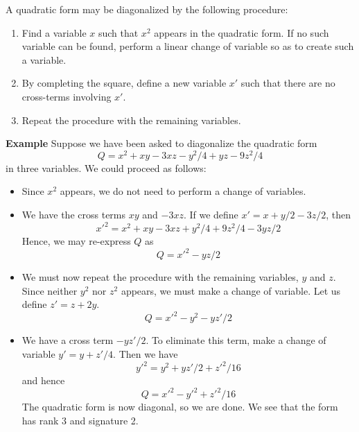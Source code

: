 \documentclass[12pt]{article}
\begin{document}
A quadratic form may be diagonalized by the following procedure:
\begin{enumerate}
\item  Find a variable $x$ such that $x^2$ appears in the quadratic form.  If no such variable can be found, perform a linear change of variable so as to create such a variable.
\item  By completing the square, define a new variable $x'$ such that there are no cross-terms involving $x'$.
\item  Repeat the procedure with the remaining variables.
\end{enumerate}

{\bf Example}
Suppose we have been asked to diagonalize the quadratic form
 $$Q = x^2 + xy - 3xz - y^2/4 + yz - 9 z^2/4$$
in three variables.  We could proceed as follows:
\begin{itemize}
\item  Since $x^2$ appears, we do not need to perform a change of variables.
\item  We have the cross terms $xy$ and $-3 xz$.  If we define $x' = x + y/2 - 3z/2$, then 
 $${x'}^2 = x^2 + xy - 3xz + y^2/4 + 9 z^2/4 - 3yz/2$$
Hence, we may re-express $Q$ as
 $$Q = {x'}^2 - yz/2$$
\item  We must now repeat the procedure with the remaining variables, $y$ and $z$.  Since neither $y^2$ nor $z^2$ appears, we must make a change of variable.  Let us define $z' = z + 2y$.
 $$Q = {x'}^2 - y^2 - yz'/2$$
\item  We have a cross term $- yz'/2$.  To eliminate this term, make a change of variable $y' = y + z'/4$.  Then we have
 $${y'}^2 = y^2 + yz'/2 + {z'}^2/16$$
and hence
 $$Q = {x'}^2 - {y'}^2 + {z'}^2/16$$
The quadratic form is now diagonal, so we are done.  We see that the form has rank 3 and signature 2.
\end{itemize}
\end{document}
